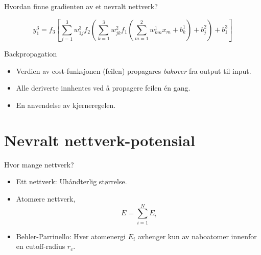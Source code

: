 \documentclass{beamer}
\begin{document}
\begin{frame}{Hvordan finne gradienten av et nevralt nettverk?}

\begin{equation*}
  y_1^3 = f_3\left[\sum_{j=1}^3 w_{1j}^3 f_2\left(\sum_{k=1}^3 w_{jk}^2 f_1\left(\sum_{m=1}^2 w_{km}^1 x_m + b_k^1\right) + b_j^2\right)
  + b_1^3\right]
\end{equation*}

\begin{block}{Backpropagation}
 \begin{itemize} 
  \item Verdien av cost-funksjonen (feilen) propagares \textit{bakover} fra output til input.
  \item Alle deriverte innhentes ved å propagere feilen én gang. 
  \item En anvendelse av kjerneregelen. 
 \end{itemize}
\end{block}
 
\end{frame}


\section{Nevralt nettverk-potensial}


\begin{frame}
 
\begin{block}{Hvor mange nettverk?}
 \begin{itemize}
  \item Ett nettverk: Uhåndterlig størrelse. 
  \item Atomære nettverk,
   \begin{equation*}
    E = \sum_{i=1}^N E_i
   \end{equation*}
   \item Behler-Parrinello: Hver atomenergi $E_i$ avhenger kun av naboatomer innenfor en cutoff-radius $r_c$. 
 \end{itemize}
\end{block}

\end{frame}
\end{document}
